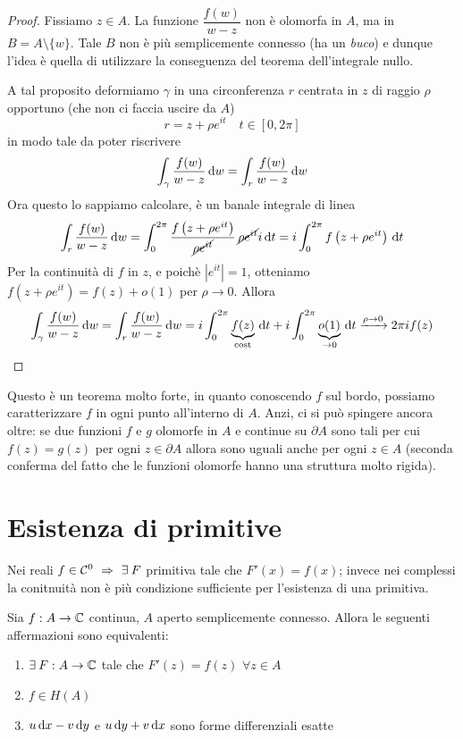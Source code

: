 \begin{proof}
Fissiamo $z\in A$. La funzione $\dfrac{f(w)}{w - z}$ non è olomorfa in $A$, ma in $B=A\setminus\{w\}$. Tale $B$ non è più semplicemente connesso (ha un \textit{buco}) e dunque l'idea è quella di utilizzare la conseguenza del teorema dell'integrale nullo.

A tal proposito deformiamo $\gamma$ in una circonferenza $r$ centrata in $z$ di raggio $\rho$ opportuno (che non ci faccia uscire da $A$)
$$
r=z+\rho e^{it} \quad t\in[0,2\pi]
$$
in modo tale da poter riscrivere
\begin{equation*}
\int_{\gamma}\frac{f(w)}{w - z} \, \mathrm{d} w=\int_{r}\frac{f(w)}{w - z} \, \mathrm{d} w
\end{equation*}
Ora questo lo sappiamo calcolare, è un banale integrale di linea
\begin{equation*}
\int_{r}\frac{f(w)}{w - z} \, \mathrm{d} w = \int^{2\pi}_{0}\frac{f\left(z + \rho e^{it}\right)}{\cancel{\rho e^{it}}}\,\cancel{\rho e^{it}}i \, \mathrm{d} t = i\int^{2\pi}_{0} f\left(z + \rho e^{it}\right) \, \mathrm{d} t
\end{equation*}
Per la continuità di $f$ in $z$, e poichè $\left|e^{it}\right|=1$, otteniamo $f\left(z + \rho e^{it}\right)=f(z)+o(1)$ per $\rho\to 0$. Allora
\begin{equation*}
\int_{\gamma}\frac{f(w)}{w - z} \, \mathrm{d} w=\int_{r}\frac{f(w)}{w - z} \, \mathrm{d} w=i\int_{0}^{2\pi} \underbrace{f(z)}_{\text{cost}}\, \mathrm{d} t+i\int_0^{2\pi} \underbrace{o(1)}_{\to 0}\, \mathrm{d} t \xrightarrow[]{\rho\to 0} 2\pi i f(z)
\end{equation*}
\end{proof}

Questo è un teorema molto forte, in quanto conoscendo $f$ sul bordo, possiamo caratterizzare $f$ in ogni punto all'interno di $A$. Anzi, ci si può spingere ancora oltre: se due funzioni $f$ e $g$ olomorfe in $A$ e continue su $\partial A$ sono tali per cui $f(z)=g(z)$ per ogni $z\in\partial A$ allora sono uguali anche per ogni $z\in A$ (seconda conferma del fatto che le funzioni olomorfe hanno una struttura molto rigida).

\section{Esistenza di primitive}

Nei reali $f\in\Cc^0\ \Rightarrow\ \exists F$ primitiva tale che $F'(x)=f(x)$; invece nei complessi la conitnuità non è più condizione sufficiente per l'esistenza di una primitiva.
\begin{thm}
Sia $f:A\to\mathbb{C}$ continua, $A$ aperto semplicemente connesso. Allora le seguenti affermazioni sono equivalenti:
\begin{enumerate}
    \item $\exists F:A\to\CC$ tale che $F'(z)=f(z)$ $\forall z\in A$
    \item $f\in H(A)$
    \item $u\, \mathrm{d} x-v\, \mathrm{d} y$ e $u\, \mathrm{d} y+v\, \mathrm{d} x$ sono forme differenziali esatte
\end{enumerate}
\end{thm}


